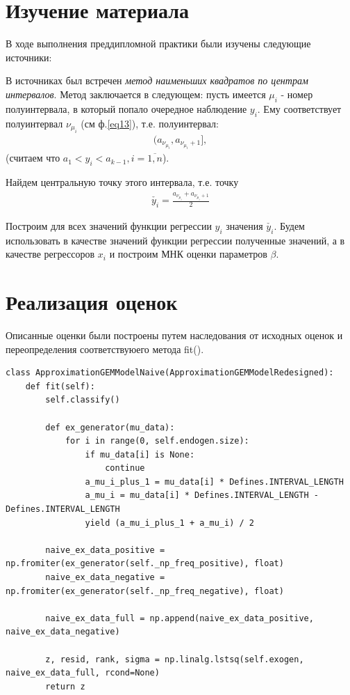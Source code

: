 

\section{Изучение материала}
В ходе выполнения преддипломной практики были изучены следующие источники:


В источниках был встречен \textit{метод наименьших квадратов по центрам интервалов}.
Метод заключается в следующем:
пусть имеется $\mu_i$ - номер полуинтервала, в который попало очередное наблюдение $y_i$. Ему соответствует полуинтервал $\nu_{\mu_i}$ (см ф.\ref{eq13}), т.е. полуинтервал:
\begin{eqnarray}
    (a_{\nu_{\mu_i}},a_{\nu_{\mu_i}+1}],
\end{eqnarray}
(считаем что $a_1<y_i<a_{k-1}, i=\overline{1,n}$).

Найдем центральную точку этого интервала, т.е. точку
\begin{eqnarray}
    \check{y_i} = \frac{a_{\nu_{\mu_i}} + a_{\nu_{\mu_i}+1}}{2}
\end{eqnarray}

Построим для всех значений функции регрессии $y_i$ значения $\check{y_i}$.
Будем использовать в качестве значений функции регрессии полученные значений, а в качестве регрессоров $x_i$ и построим МНК оценки параметров $\beta$.

\newpage
\section{Реализация оценок}
Описанные оценки были построены путем наследования от исходных оценок и переопределения соответствуюего метода fit(). 
\begin{Verbatim}[fontsize=\scriptsize]
class ApproximationGEMModelNaive(ApproximationGEMModelRedesigned):
    def fit(self):
        self.classify()

        def ex_generator(mu_data):
            for i in range(0, self.endogen.size):
                if mu_data[i] is None:
                    continue
                a_mu_i_plus_1 = mu_data[i] * Defines.INTERVAL_LENGTH
                a_mu_i = mu_data[i] * Defines.INTERVAL_LENGTH - Defines.INTERVAL_LENGTH
                yield (a_mu_i_plus_1 + a_mu_i) / 2

        naive_ex_data_positive = np.fromiter(ex_generator(self._np_freq_positive), float)
        naive_ex_data_negative = np.fromiter(ex_generator(self._np_freq_negative), float)

        naive_ex_data_full = np.append(naive_ex_data_positive, naive_ex_data_negative)

        z, resid, rank, sigma = np.linalg.lstsq(self.exogen, naive_ex_data_full, rcond=None)
        return z
\end{Verbatim}

